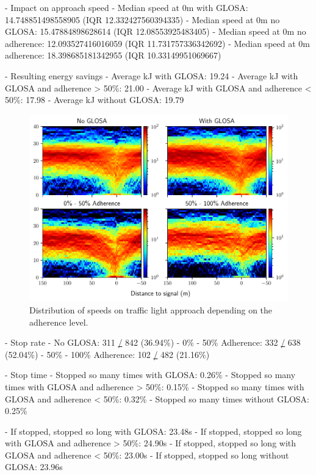 - Impact on approach speed
- Median speed at 0m with GLOSA: 14.748851498558905 (IQR 12.332427560394335)
- Median speed at 0m no GLOSA: 15.47884898628614 (IQR 12.08553925483405)
- Median speed at 0m no adherence: 12.093527416016059 (IQR 11.731757336342692)
- Median speed at 0m adherence: 18.398685181342955 (IQR 10.33149951069667)

- Resulting energy savings
- Average kJ with GLOSA: 19.24 
- Average kJ with GLOSA and adherence > 50\%: 21.00 
- Average kJ with GLOSA and adherence < 50\%: 17.98 
- Average kJ without GLOSA: 19.79

\begin{figure}[t]
\caption{Distribution of speeds on traffic light approach depending on the adherence level.}\label{fig:impacts-approach-speed-heatmap}
\includegraphics[width=\linewidth]{images/impacts-approach-speed-heatmap.pdf}
\end{figure}

- Stop rate
- No GLOSA: 311 \href{https://file+.vscode-resource.vscode-cdn.net/}{/} 842 (36.94\%) 
- 0\% - 50\% Adherence: 332 \href{https://file+.vscode-resource.vscode-cdn.net/}{/} 638 (52.04\%) 
- 50\% - 100\% Adherence: 102 \href{https://file+.vscode-resource.vscode-cdn.net/}{/} 482 (21.16\%)

- Stop time
- Stopped so many times with GLOSA: 0.26\% 
- Stopped so many times with GLOSA and adherence > 50\%: 0.15\% 
- Stopped so many times with GLOSA and adherence < 50\%: 0.32\% 
- Stopped so many times without GLOSA: 0.25\% 

- If stopped, stopped so long with GLOSA: 23.48s 
- If stopped, stopped so long with GLOSA and adherence > 50\%: 24.90s 
- If stopped, stopped so long with GLOSA and adherence < 50\%: 23.00s 
- If stopped, stopped so long without GLOSA: 23.96s

